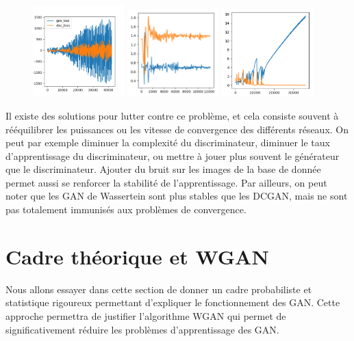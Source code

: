 \begin{figure}[!h]
\centering
\includegraphics[width=100pt]{"images/GAN/failure1"}
\includegraphics[width=100pt]{"images/GAN/failure2"}
\includegraphics[width=100pt]{"images/GAN/failure3"}
\caption{}
\label{perte_eq}
\end{figure}


Il existe des solutions pour lutter contre ce problème, et cela consiste souvent à rééquilibrer les puissances ou les vitesse de convergence des différents réseaux. On peut par exemple diminuer la complexité du discriminateur, diminuer le taux d'apprentissage du discriminateur, ou mettre à jouer plus souvent le générateur que le discriminateur.
Ajouter du bruit sur les images de la base de donnée permet aussi se renforcer la stabilité de l'apprentissage. Par ailleurs, on peut noter que les GAN de Wassertein sont plus stables que les DCGAN, mais ne sont pas totalement immunisés aux problèmes de convergence.

\section{Cadre théorique et WGAN}
Nous allons essayer dans cette section de donner un cadre probabiliste et statistique rigoureux permettant d'expliquer le fonctionnement des GAN. Cette approche permettra de justifier l'algorithme WGAN qui permet de significativement réduire les problèmes d'apprentissage des GAN.

